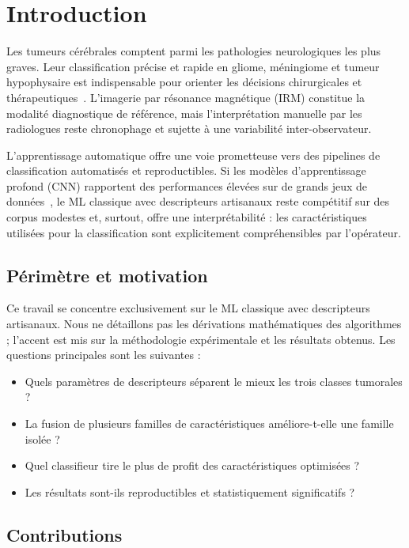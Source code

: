\section{Introduction}

Les tumeurs cérébrales comptent parmi les pathologies neurologiques les plus graves.
Leur classification précise et rapide en gliome, méningiome et tumeur hypophysaire
est indispensable pour orienter les décisions chirurgicales et thérapeutiques~\cite{ref_bioengineering11030266}.
L'imagerie par résonance magnétique (IRM) constitue la modalité diagnostique de référence,
mais l'interprétation manuelle par les radiologues reste chronophage et sujette à une
variabilité inter-observateur.

L'apprentissage automatique offre une voie prometteuse vers des pipelines de classification
automatisés et reproductibles. Si les modèles d'apprentissage profond (CNN) rapportent
des performances élevées sur de grands jeux de données~\cite{ref_diagnostics15212692},
le ML classique avec descripteurs artisanaux reste compétitif sur des corpus modestes
et, surtout, offre une interprétabilité : les caractéristiques utilisées pour la
classification sont explicitement compréhensibles par l'opérateur.

\subsection{Périmètre et motivation}

Ce travail se concentre exclusivement sur le ML classique avec descripteurs artisanaux.
Nous ne détaillons pas les dérivations mathématiques des algorithmes ; l'accent est
mis sur la méthodologie expérimentale et les résultats obtenus. Les questions principales
sont les suivantes :

\begin{itemize}
  \item Quels paramètres de descripteurs séparent le mieux les trois classes tumorales ?
  \item La fusion de plusieurs familles de caractéristiques améliore-t-elle une famille isolée ?
  \item Quel classifieur tire le plus de profit des caractéristiques optimisées ?
  \item Les résultats sont-ils reproductibles et statistiquement significatifs ?
\end{itemize}

\subsection{Contributions}

